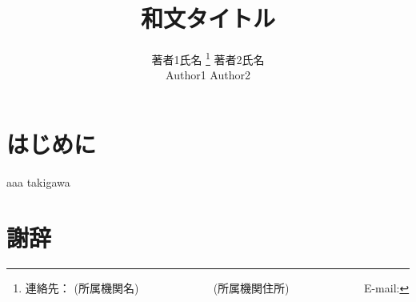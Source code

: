 \documentclass[a4j]{jarticle}
\begin{document}
\title{和文タイトル}



\author{著者1氏名%
	\thanks{連絡先： (所属機関名) \newline%
		　　　　　　 (所属機関住所) \newline%
		　　　　　　 E-mail: }\quad%
	著者2氏名\\
	Author1 \quad \quad Author2}


\abstract{
}

\maketitle
\thispagestyle{empty}

\section{はじめに}
aaa\cite{gSpan}
takigawa\cite{2016sys}


\section*{謝辞}



\end{document}
